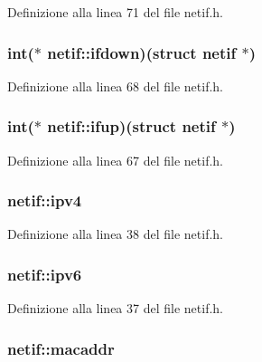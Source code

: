 Definizione alla linea 71 del file netif.\+h.

\hypertarget{structnetif_a73d7967fecfead19c8ae2a39a8cbf112}{
\subsubsection[{ifdown}]{\setlength{\rightskip}{0pt plus 5cm}int($\ast$ netif\+::ifdown)(struct {\bf netif} $\ast$)}}\label{structnetif_a73d7967fecfead19c8ae2a39a8cbf112}


Definizione alla linea 68 del file netif.\+h.

\hypertarget{structnetif_a70984b0d611d5a941aecabbc98f62467}{
\subsubsection[{ifup}]{\setlength{\rightskip}{0pt plus 5cm}int($\ast$ netif\+::ifup)(struct {\bf netif} $\ast$)}}\label{structnetif_a70984b0d611d5a941aecabbc98f62467}


Definizione alla linea 67 del file netif.\+h.

\hypertarget{structnetif_a312a8e870ce8803f02f5b09012ce6bc6}{
\subsubsection[{ipv4}]{ netif\+::ipv4}}\label{structnetif_a312a8e870ce8803f02f5b09012ce6bc6}


Definizione alla linea 38 del file netif.\+h.

\hypertarget{structnetif_aced1ed63f6f33dd3987a06deee6a2292}{
\subsubsection[{ipv6}]{ netif\+::ipv6}}\label{structnetif_aced1ed63f6f33dd3987a06deee6a2292}


Definizione alla linea 37 del file netif.\+h.

\hypertarget{structnetif_a7a5c433a646e2b4424fe8ebf12db535c}{
\subsubsection[{macaddr}]{ netif\+::macaddr}}\label{structnetif_a7a5c433a646e2b4424fe8ebf12db535c}


